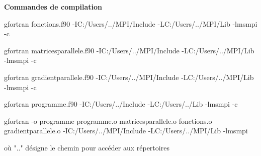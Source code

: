 \documentclass[a4paper,12pt,twoside]{report}
\begin{document}
\clearpage
\begin{center}\textbf{{Commandes de compilation }}\end{center}


gfortran  fonctions.f90 
-IC:/Users/../MPI/Include -LC:/Users/../MPI/Lib -lmsmpi -c

gfortran  matricesparallele.f90 -IC:/Users/../MPI/Include -LC:/Users/../MPI/Lib -lmsmpi -c

gfortran  gradientparallele.f90 -IC:/Users/../MPI/Include -LC:/Users/../MPI/Lib -lmsmpi -c

gfortran  programme.f90 -IC:/Users/../Include -LC:/Users/../Lib -lmsmpi -c

gfortran  -o programme programme.o matricesparallele.o fonctions.o gradientparallele.o -IC:/Users/../MPI/Include -LC:/Users/../MPI/Lib -lmsmpi

où ".." désigne le chemin pour accéder aux répertoires
\end{document}
